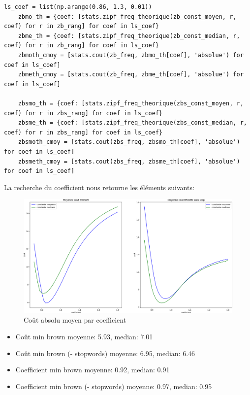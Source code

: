 			\begin{lstlisting}[title=Calcul des fréquences par coefficient]
    ls_coef = list(np.arange(0.86, 1.3, 0.01))
    zbmo_th = {coef: [stats.zipf_freq_theorique(zb_const_moyen, r, coef) for r in zb_rang] for coef in ls_coef}
    zbme_th = {coef: [stats.zipf_freq_theorique(zb_const_median, r, coef) for r in zb_rang] for coef in ls_coef}
    zbmoth_cmoy = [stats.cout(zb_freq, zbmo_th[coef], 'absolue') for coef in ls_coef]
    zbmeth_cmoy = [stats.cout(zb_freq, zbme_th[coef], 'absolue') for coef in ls_coef]

    zbsmo_th = {coef: [stats.zipf_freq_theorique(zbs_const_moyen, r, coef) for r in zbs_rang] for coef in ls_coef}
    zbsme_th = {coef: [stats.zipf_freq_theorique(zbs_const_median, r, coef) for r in zbs_rang] for coef in ls_coef}
    zbsmoth_cmoy = [stats.cout(zbs_freq, zbsmo_th[coef], 'absolue') for coef in ls_coef]
    zbsmeth_cmoy = [stats.cout(zbs_freq, zbsme_th[coef], 'absolue') for coef in ls_coef] \end{lstlisting}

		La recherche du coefficient nous retourne les éléments suivants:
			\begin{figure}[H]
				\includegraphics[width=\linewidth]{img/coutZipf.png}
				\caption{Coût absolu moyen par coefficient}
			\end{figure}

			\begin{itemize}
				\item Coût min brown moyenne: 5.93, median: 7.01
				\item Coût min brown (- stopwords) moyenne: 6.95, median: 6.46
				\item Coefficient min brown moyenne: 0.92, median: 0.91
				\item Coefficient min brown (- stopwords) moyenne: 0.97, median: 0.95
			\end{itemize}

